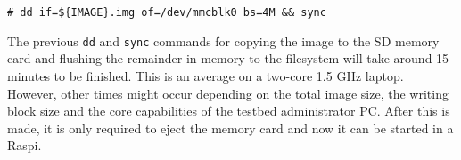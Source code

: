 \begin{lstlisting}[]
# dd if=${IMAGE}.img of=/dev/mmcblk0 bs=4M && sync
\end{lstlisting}
\FloatBarrier
\vspace{-5mm}

The previous \texttt{dd} and \texttt{sync} commands for copying the image to
the SD memory card and flushing the remainder in memory to the filesystem
will take around 15 minutes to be finished. This is an average on a two-core
1.5 GHz laptop. However, other times might occur depending on the total image
size, the writing block size and the core capabilities of the testbed
administrator \ac{PC}. After this is made, it is only required
to eject the memory card and now it can be started in a \ac{Raspi}.
